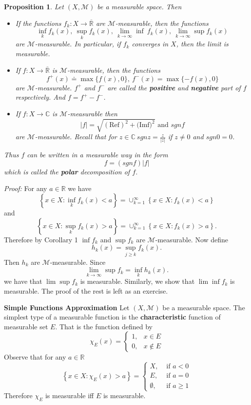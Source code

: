 \documentclass[12pt]{report}
\newtheorem{prop}[theorem]{Proposition}
\begin{document}
\begin{prop} Let $(X, \mathcal{M})$ be a
measurable space.  Then
\begin{itemize}
\item[(a)]  If the functions $f_k: X \longrightarrow
\overline{\mathbb{R}}$ are
$\mathcal{M}$-measurable, then the functions
\[
\inf_k f_k(x),\  \sup_k f_k(x), \ \lim_{k \to \infty}\inf \
f_k(x), 
\ \lim_{k \to \infty}\sup f_k (x) 
\]
are $\mathcal{M}$-measurable.  In particular, if $f_k$
converges in $X$, then the limit is measurable.
\item[(b)]  If $f: X \longrightarrow
\overline{\mathbb{R}}$ is
$\mathcal{M}$-measurable, then the functions
\[ 
f^+(x) \doteq \max \{f(x), 0\}, \ f^-(x) = \max \{-f(x), 0\}
\]
are $\mathcal{M}$-measurable. $f^+$ and $f^-$ are called
the
\textbf{positive} and \textbf{negative} part of $f$ respectively.  And
$f = f^+ - f^-$.
\item[(c)]  If $f: X \longrightarrow \mathbb{C}$ is
$\mathcal{M}$-measurable then
\[ 
|f| = \sqrt{(\mbox{Ref})^2 + (\mbox{Imf)}^2} \mbox{ and } sgn f
\]
are $\mathcal{M}$-measurable.  Recall that for 
$z \in \mathbb{C}\  sgn z =
\frac{z}{|z|}$ if $ z \ne 0$ and $sgn 0 = 0$.
\end{itemize}
Thus $f$ can be written in a measurable way in the form
\[
 f = (sgn f) |f|
\]
 which is called the \textbf{polar} decomposition of $f$.
\end{prop}

\medskip
\noindent
{\em Proof:}  For any $a \in \mathbb{R}$ we have
\[
\left \{ x \in X: \inf_k f_k(x) < a \right \} =
{\cup}^\infty_{k=1}\left \{x \in X: f_k(x) < a \right \}
\] and
\[
\left \{ x \in X: \sup_k f_k(x) > a \right\} =
{\cup}^\infty_{k=1}\left \{ x \in X: f_k (x) > a
\right
\}.
\]
 Therefore by Corollary 1 $\inf f_k$ and $\sup f_k$ are
$\mathcal{M}$-measurable.  Now define
\[
 h_k (x) = \sup_{j \ge k} f_k (x).
\]
 Then $h_k$ are $\mathcal{M}$-measurable.  Since
\[
\lim_{k \to \infty} \sup f_k = \inf_k h_k(x).
\]
 we have that $\lim\sup f_k$ is measurable.  Similarly, we show
that
$\lim \inf f_k$ is measurable.  The proof of the rest is left as an
exercise.
 
\medskip
\noindent
{\large \bf Simple Functions Approximation}
 Let $(X,
\mathcal{M})$ be a measurable space.  The simplest type of a
measurable function is the
\textbf{characteristic} function of measurable set
$E$.  That is the function defined by
\[
\chi_E (x) = \left \{ \begin{array}{ll} 1, &x \in E\\ 0, &x \notin E
\end{array} \right .
\]
 Observe that for any $a \in \mathbb{R}$
\[
\left \{x \in X: \chi_E (x) > a \right \} = \left \{ \begin{array}{ll} X,
&\mbox{ if } a < 0\\ E, &\mbox{ if } a = 0\\
\emptyset, &\mbox{ if } a \ge 1 \end{array} \right .
\] Therefore $\chi_E$ is measurable iff $E$ is measurable.
\end{document}
